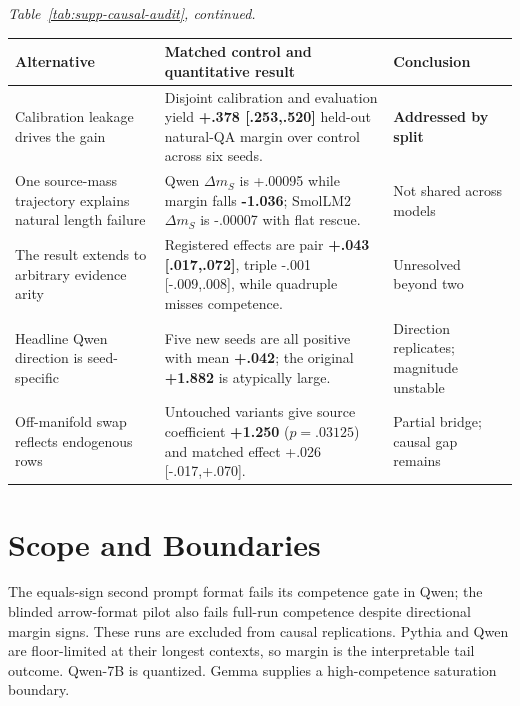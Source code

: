 \documentclass[letterpaper]{article} %
\newcommand{\helpful}[1]{\textcolor{pennblue}{\bfseries #1}}
\newcommand{\utilityhelpful}[1]{\textcolor{pennblue}{\bfseries #1}}
\newcommand{\harmful}[1]{\textcolor{pennred}{\bfseries #1}}
\newcommand{\neutral}[1]{\textcolor{controlgray}{#1}}
\newcommand{\diagnostic}[1]{\textcolor{controlgray}{#1}}
\begin{document}
\noindent\begin{minipage}{\columnwidth}
\centering
\scriptsize
\noindent\textit{Table~\ref{tab:supp-causal-audit}, continued.}\par\smallskip
\setlength{\tabcolsep}{2.0pt}
\begin{tabular}{>{\raggedright\arraybackslash}p{}
                >{\raggedright\arraybackslash}p{}
                >{\raggedright\arraybackslash}p{}}
\toprule
Alternative & Matched control and quantitative result & Conclusion \\
\midrule
Calibration leakage drives the gain & Disjoint calibration and evaluation yield \utilityhelpful{+.378 [.253,.520]} held-out natural-QA margin over control across six seeds. & \helpful{Addressed by split} \\
One source-mass trajectory explains natural length failure & Qwen $\Delta m_S$ is \diagnostic{+.00095} while margin falls \harmful{-1.036}; SmolLM2 $\Delta m_S$ is \diagnostic{-.00007} with flat rescue. & \diagnostic{Not shared across models} \\
The result extends to arbitrary evidence arity & Registered effects are pair \helpful{+.043 [.017,.072]}, triple \neutral{-.001 [-.009,.008]}, while quadruple misses competence. & \diagnostic{Unresolved beyond two} \\
Headline Qwen direction is seed-specific & Five new seeds are all positive with mean \helpful{+.042}; the original \helpful{+1.882} is atypically large. & \diagnostic{Direction replicates; magnitude unstable} \\
Off-manifold swap reflects endogenous rows & Untouched variants give source coefficient \helpful{+1.250} ($p=.03125$) and matched effect \neutral{+.026 [-.017,+.070]}. & \diagnostic{Partial bridge; causal gap remains} \\
\bottomrule
\end{tabular}
\end{minipage}\par\medskip

\section{Scope and Boundaries}

The equals-sign second prompt format fails its competence gate in Qwen; the blinded arrow-format pilot also
fails full-run competence despite directional margin signs. These runs are excluded from causal
replications. Pythia and Qwen are floor-limited at their longest contexts, so margin is the interpretable
tail outcome. Qwen-7B is quantized. Gemma supplies a high-competence saturation boundary.
\end{document}
